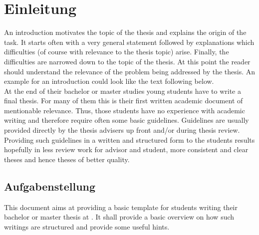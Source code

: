 
\chapter{Einleitung}
\label{sect:introduction}


An introduction motivates the topic of the thesis and explains the origin of the task. 
It starts often with a very general statement followed by explanations which difficulties (of course with relevance to the thesis topic) arise.
Finally, the difficulties are narrowed down to the topic of the thesis.
At this point the reader should understand the relevance of the problem being addressed by the thesis.
An example for an introduction could look like the text following below. \\

At the end of their bachelor or master studies young students have to write a final thesis.
For many of them this is their first written academic document of mentionable relevance.
Thus, those students have no experience with academic writing and therefore require often some basic guidelines.
Guidelines are usually provided directly by the thesis advisers up front and/or during thesis review.
Providing such guidelines in a written and structured form to the students results hopefully in less review work for advisor and student, more consistent and clear theses and hence theses of better quality. 

\section{Aufgabenstellung}
\label{sect:main_contributions}
This document aims at providing a basic template for students writing their bachelor or master thesis at .
It shall provide a basic overview on how such writings are structured and provide some useful hints.

